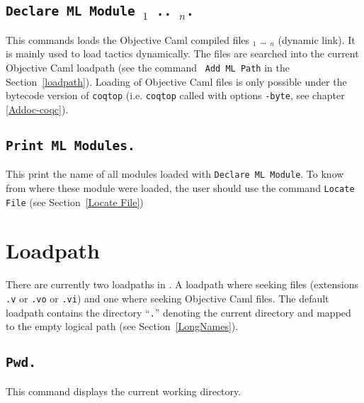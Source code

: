 \subsection[\tt Declare ML Module {\str$_1$} .. {\str$_n$}.]{\tt Declare ML Module {\str$_1$} .. {\str$_n$}.}
This commands loads the Objective Caml compiled files {\str$_1$} \dots
{\str$_n$} (dynamic link). It is mainly used to load tactics
dynamically.
 The files are
searched into the current Objective Caml loadpath (see the command {\tt
Add ML Path} in the Section~\ref{loadpath}).  Loading of Objective Caml
files is only possible under the bytecode version of {\tt coqtop}
(i.e. {\tt coqtop} called with options {\tt -byte}, see chapter 
\ref{Addoc-coqc}).

\begin{ErrMsgs}
\item {}
\item {}
\end{ErrMsgs}

\subsection[\tt Print ML Modules.]{\tt Print ML Modules.}
This print the name of all \ocaml{} modules loaded with \texttt{Declare
  ML Module}. To know from where these module were loaded, the user
should use the command \texttt{Locate File} (see Section~\ref{Locate File})

\section[Loadpath]{Loadpath\label{loadpath}}

There are currently two loadpaths in \Coq. A loadpath where seeking
{\Coq} files (extensions {\tt .v} or {\tt .vo} or {\tt .vi}) and one where
seeking Objective Caml files. The default loadpath contains the
directory ``\texttt{.}'' denoting the current directory and mapped to the empty logical path (see Section~\ref{LongNames}).

\subsection[\tt Pwd.]{\tt Pwd.\label{Pwd}}
This command displays the current working directory.

